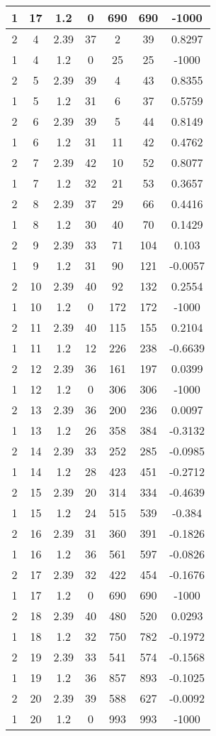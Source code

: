 \documentclass[letterpaper, 12pt]{article}
\begin{document}
\begin{longtable}{|c|c|c|c|c|c|c|}
\hline
1 & 17 & 1.2 & 0 & 690 & 690 & -1000 \\
\hline
2 & 4 & 2.39 & 37 & 2 & 39 & 0.8297 \\
\hline
1 & 4 & 1.2 & 0 & 25 & 25 & -1000 \\
\hline
2 & 5 & 2.39 & 39 & 4 & 43 & 0.8355 \\
\hline
1 & 5 & 1.2 & 31 & 6 & 37 & 0.5759 \\
\hline
2 & 6 & 2.39 & 39 & 5 & 44 & 0.8149 \\
\hline
1 & 6 & 1.2 & 31 & 11 & 42 & 0.4762 \\
\hline
2 & 7 & 2.39 & 42 & 10 & 52 & 0.8077 \\
\hline
1 & 7 & 1.2 & 32 & 21 & 53 & 0.3657 \\
\hline
2 & 8 & 2.39 & 37 & 29 & 66 & 0.4416 \\
\hline
1 & 8 & 1.2 & 30 & 40 & 70 & 0.1429 \\
\hline
2 & 9 & 2.39 & 33 & 71 & 104 & 0.103 \\
\hline
1 & 9 & 1.2 & 31 & 90 & 121 & -0.0057 \\
\hline
2 & 10 & 2.39 & 40 & 92 & 132 & 0.2554 \\
\hline
1 & 10 & 1.2 & 0 & 172 & 172 & -1000 \\
\hline
2 & 11 & 2.39 & 40 & 115 & 155 & 0.2104 \\
\hline
1 & 11 & 1.2 & 12 & 226 & 238 & -0.6639 \\
\hline
2 & 12 & 2.39 & 36 & 161 & 197 & 0.0399 \\
\hline
1 & 12 & 1.2 & 0 & 306 & 306 & -1000 \\
\hline
2 & 13 & 2.39 & 36 & 200 & 236 & 0.0097 \\
\hline
1 & 13 & 1.2 & 26 & 358 & 384 & -0.3132 \\
\hline
2 & 14 & 2.39 & 33 & 252 & 285 & -0.0985 \\
\hline
1 & 14 & 1.2 & 28 & 423 & 451 & -0.2712 \\
\hline
2 & 15 & 2.39 & 20 & 314 & 334 & -0.4639 \\
\hline
1 & 15 & 1.2 & 24 & 515 & 539 & -0.384 \\
\hline
2 & 16 & 2.39 & 31 & 360 & 391 & -0.1826 \\
\hline
1 & 16 & 1.2 & 36 & 561 & 597 & -0.0826 \\
\hline
2 & 17 & 2.39 & 32 & 422 & 454 & -0.1676 \\
\hline
1 & 17 & 1.2 & 0 & 690 & 690 & -1000 \\
\hline
2 & 18 & 2.39 & 40 & 480 & 520 & 0.0293 \\
\hline
1 & 18 & 1.2 & 32 & 750 & 782 & -0.1972 \\
\hline
2 & 19 & 2.39 & 33 & 541 & 574 & -0.1568 \\
\hline
1 & 19 & 1.2 & 36 & 857 & 893 & -0.1025 \\
\hline
2 & 20 & 2.39 & 39 & 588 & 627 & -0.0092 \\
\hline
1 & 20 & 1.2 & 0 & 993 & 993 & -1000 \\
\hline
\end{longtable}
\end{document}

